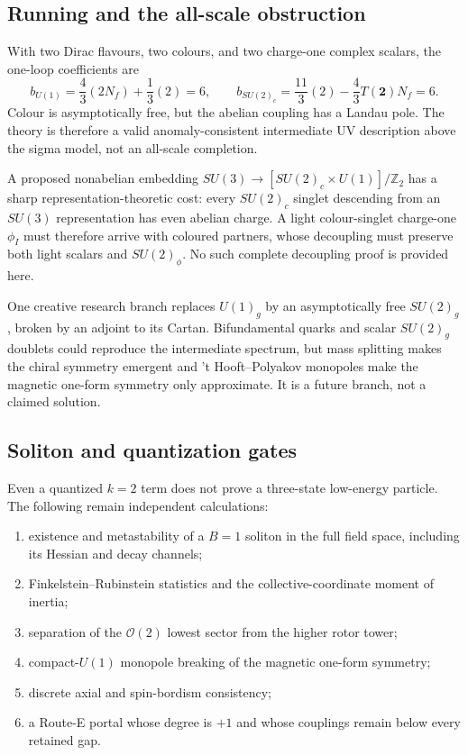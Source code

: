 \documentclass[11pt]{article}
\theoremstyle{definition}
\theoremstyle{remark}
\newcommand{\ZZ}{\mathbb Z}
\newcommand{\cO}{\mathcal O}
\begin{document}
\subsection{Running and the all-scale obstruction}

With two Dirac flavours, two colours, and two charge-one complex scalars, the
one-loop coefficients are
\begin{equation}
 b_{U(1)}=\frac43(2N_f)+\frac13(2)=6,
 \qquad
 b_{SU(2)_c}=\frac{11}{3}(2)-\frac43T(\bm2)N_f=6.
 \label{eq:beta-coefficients}
\end{equation}
Colour is asymptotically free, but the abelian coupling has a Landau pole.
The theory is therefore a valid anomaly-consistent intermediate UV
description above the sigma model, not an all-scale completion.

A proposed nonabelian embedding
\(SU(3)\to[SU(2)_c\times U(1)]/\ZZ_2\) has a sharp representation-theoretic
cost: every \(SU(2)_c\) singlet descending from an \(SU(3)\) representation
has even abelian charge.  A light colour-singlet charge-one \(\phi_I\) must
therefore arrive with coloured partners, whose decoupling must preserve both
light scalars and \(SU(2)_\phi\).  No such complete decoupling proof is
provided here.

One creative research branch replaces \(U(1)_g\) by an asymptotically free
\(SU(2)_g\), broken by an adjoint to its Cartan.  Bifundamental quarks and
scalar \(SU(2)_g\) doublets could reproduce the intermediate spectrum, but
mass splitting makes the chiral symmetry emergent and
't Hooft--Polyakov monopoles make the magnetic one-form symmetry only
approximate.  It is a future branch, not a claimed solution.

\subsection{Soliton and quantization gates}

Even a quantized \(k=2\) term does not prove a three-state low-energy particle.
The following remain independent calculations:
\begin{enumerate}
\item existence and metastability of a \(B=1\) soliton in the full field
  space, including its Hessian and decay channels;
\item Finkelstein--Rubinstein statistics and the collective-coordinate
  moment of inertia;
\item separation of the \(\cO(2)\) lowest sector from the higher rotor tower;
\item compact-\(U(1)\) monopole breaking of the magnetic one-form symmetry;
\item discrete axial and spin-bordism consistency;
\item a Route-E portal whose degree is \(+1\) and whose couplings remain below
  every retained gap.
\end{enumerate}
\end{document}
